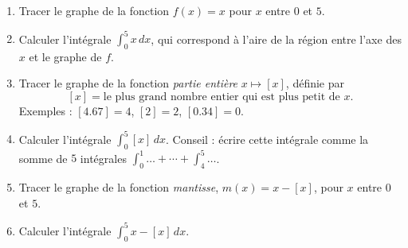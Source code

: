 
\begin{exercice}\label{exoExamenDecembre2010-0001}

  \begin{enumerate}
  \item Tracer le graphe de la fonction $f(x)=x$ pour $x$ entre $0$ et $5$.
    \item Calculer l'intégrale $\displaystyle \int_{0}^{5} x\, dx$, qui correspond à l'aire de la région entre l'axe des $x$ et le graphe de $f$.
      \item Tracer le graphe de la fonction \emph{partie entière} $x\mapsto [x]$, définie par 
        \[[x]=\textrm{le plus grand nombre entier qui est plus petit de } x.
        \]
        Exemples : $[4.67]=4$, $[2]=2$, $[0.34]=0$.
        \item Calculer l'intégrale $\displaystyle \int_{0}^{5} [x]\, dx$. Conseil : écrire cette intégrale comme la somme de $5$ intégrales $\int_{0}^{1}\ldots+ \cdots +\int_{4}^{5}\ldots$. 
          \item Tracer le graphe de la fonction \emph{mantisse}, $m(x)=x-[x]$, pour $x$ entre $0$ et $5$.
          \item Calculer l'intégrale $\displaystyle \int_{0}^{5} x-[x]\, dx$.
  \end{enumerate}
\end{exercice}
